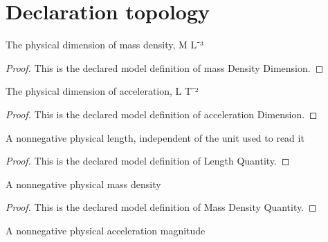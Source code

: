 \section{Declaration topology}
\begin{definition}
  \label{def:physics:phyx-mini-0388:phyxminiproblems-problemphyxmini0388-massdensitydimension}
  The physical dimension of mass density, M L⁻³
\end{definition}
\begin{proof}
  This is the declared model definition of mass Density Dimension.
\end{proof}
\begin{definition}
  \label{def:physics:phyx-mini-0388:phyxminiproblems-problemphyxmini0388-accelerationdimension}
  The physical dimension of acceleration, L T⁻²
\end{definition}
\begin{proof}
  This is the declared model definition of acceleration Dimension.
\end{proof}
\begin{definition}
  \label{def:physics:phyx-mini-0388:phyxminiproblems-problemphyxmini0388-lengthquantity}
  A nonnegative physical length, independent of the unit used to read it
\end{definition}
\begin{proof}
  This is the declared model definition of Length Quantity.
\end{proof}
\begin{definition}
  \label{def:physics:phyx-mini-0388:phyxminiproblems-problemphyxmini0388-massdensityquantity}
  A nonnegative physical mass density
\end{definition}
\begin{proof}
  This is the declared model definition of Mass Density Quantity.
\end{proof}
\begin{definition}
  \label{def:physics:phyx-mini-0388:phyxminiproblems-problemphyxmini0388-accelerationquantity}
  A nonnegative physical acceleration magnitude
\end{definition}
